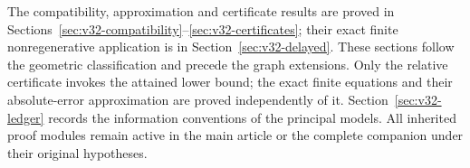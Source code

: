 The compatibility, approximation and certificate results are proved in
Sections~\ref{sec:v32-compatibility}--\ref{sec:v32-certificates}; their
exact finite nonregenerative application is in
Section~\ref{sec:v32-delayed}. These sections follow the geometric
classification and precede the graph extensions. Only the relative
certificate invokes the attained lower bound; the exact finite equations
and their absolute-error approximation are proved independently of it.
Section~\ref{sec:v32-ledger} records the information conventions of the
principal models. All inherited proof modules remain active in the main
article or the complete companion under their original hypotheses.
